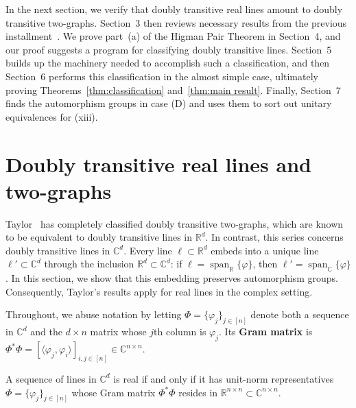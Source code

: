 In the next section, we verify that doubly transitive real lines amount to doubly transitive two-graphs.
Section~3 then reviews necessary results from the previous installment~\cite{IversonM:18}.
We prove part~(a) of the Higman Pair Theorem in Section~4, and our proof suggests a program for classifying doubly transitive lines.
Section~5 builds up the machinery needed to accomplish such a classification, and then Section~6 performs this classification in the almost simple case, ultimately proving Theorems~\ref{thm:classification} and~\ref{thm:main result}.
Finally, Section~7 finds the automorphism groups in case (D) and uses them to sort out unitary equivalences for (xiii).

\section{
Doubly transitive real lines and two-graphs}
\label{sec:real}

Taylor~\cite{Taylor:92} has completely classified doubly transitive two-graphs, which are known to be equivalent to doubly transitive lines in $\mathbb{R}^d$.
In contrast, this series concerns doubly transitive lines in $\mathbb{C}^d$.
Every line $\ell \subset \mathbb{R}^d$ embeds into a unique line $\ell' \subset \mathbb{C}^d$ through the inclusion $\mathbb{R}^d \subset \mathbb{C}^d$: if $\ell = \operatorname{span}_{\mathbb{R}} \{ \varphi \}$, then $\ell' = \operatorname{span}_{\mathbb{C}} \{ \varphi \}$.
In this section, we show that this embedding preserves automorphism groups.
Consequently, Taylor's results apply for real lines in the complex setting.

Throughout, we abuse notation by letting $\Phi=\{\varphi_j\}_{j\in[n]}$ denote both a sequence in $\mathbb{C}^d$ and the $d\times n$ matrix whose $j$th column is $\varphi_j$.
Its \textbf{Gram matrix} is $\Phi^* \Phi = [ \langle \varphi_j, \varphi_i \rangle ]_{i,j \in [n]} \in \mathbb{C}^{n\times n}$.

\begin{proposition}
\label{prop:real lines are real}
A sequence of lines in $\mathbb{C}^d$ is real if and only if it has unit-norm representatives $\Phi = \{ \varphi_j \}_{j\in [n]}$ whose Gram matrix $\Phi^* \Phi$ resides in $\mathbb{R}^{n\times n} \subset \mathbb{C}^{n\times n}$.
\end{proposition}

